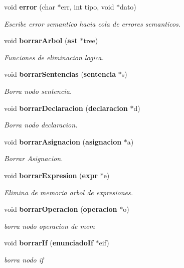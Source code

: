 \begin{CompactItemize}
void {\bf error} (char $\ast$err, int tipo, void $\ast$dato)
\begin{CompactList}\small\item\em Escribe error semantico hacia cola de errores semanticos. \item\end{CompactList}\item 
void {\bf borrar\-Arbol} ({\bf ast} $\ast$tree)
\begin{CompactList}\small\item\em Funciones de eliminacion logica. \item\end{CompactList}\item 
void {\bf borrar\-Sentencias} ({\bf sentencia} $\ast$s)
\begin{CompactList}\small\item\em Borra nodo sentencia. \item\end{CompactList}\item 
void {\bf borrar\-Declaracion} ({\bf declaracion} $\ast$d)
\begin{CompactList}\small\item\em Borra nodo declaracion. \item\end{CompactList}\item 
void {\bf borrar\-Asignacion} ({\bf asignacion} $\ast$a)
\begin{CompactList}\small\item\em Borrar Asignacion. \item\end{CompactList}\item 
void {\bf borrar\-Expresion} ({\bf expr} $\ast$e)
\begin{CompactList}\small\item\em Elimina de memoria arbol de expresiones. \item\end{CompactList}\item 
void {\bf borrar\-Operacion} ({\bf operacion} $\ast$o)
\begin{CompactList}\small\item\em borra nodo operacion de mem \item\end{CompactList}\item 
void {\bf borrar\-If} ({\bf enunciado\-If} $\ast$eif)
\begin{CompactList}\small\item\em borra nodo if \item\end{CompactList}\item 

\end{CompactItemize}
